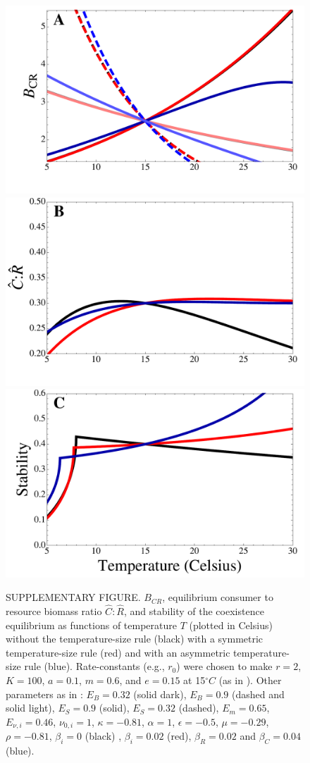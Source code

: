 \documentclass[11pt]{article}
\begin{document}
\begin{figure}[!ht]
\centering
\includegraphics[width=0.5\linewidth]{BCRAllTempMassDepAsymm}
\includegraphics[width=0.5\linewidth]{CtoRAllTempMassDepAsymm}
\includegraphics[width=0.5\linewidth]{StabilityAllTempMassDepAsymm}
\caption{
SUPPLEMENTARY FIGURE.
$B_{CR}$, equilibrium consumer to resource biomass ratio $\hat{C}:\hat{R}$, and stability of the coexistence equilibrium as functions of temperature $T$ (plotted in Celsius) without the temperature-size rule (black) with a symmetric temperature-size rule (red) and with an asymmetric temperature-size rule (blue).
Rate-constants (e.g., $r_0$) were chosen to make $r = 2$, $K = 100$, $a = 0.1$, $m = 0.6$, and $e = 0.15$ at 15$^\circ C$ (as in \cite{Gilbert2014}).
Other parameters as in \cite{Gilbert2014,DeLong2015,Forster2012}: $E_B = 0.32$ (solid dark), $E_B = 0.9$ (dashed and solid light), $E_S = 0.9$ (solid), $E_S = 0.32$ (dashed), $E_m = 0.65$, $E_{\nu,i} = 0.46$, $\nu_{0,i} = 1$, $\kappa = -0.81$, $\alpha = 1$, $\epsilon = -0.5$, $\mu = -0.29$, $\rho = -0.81$, $\beta_i = 0$ (black) , $\beta_i = 0.02$ (red), $\beta_R = 0.02$ and $\beta_C = 0.04$ (blue).  
}
\label{AllTempMassDepAsymm}
\end{figure}
\end{document}
